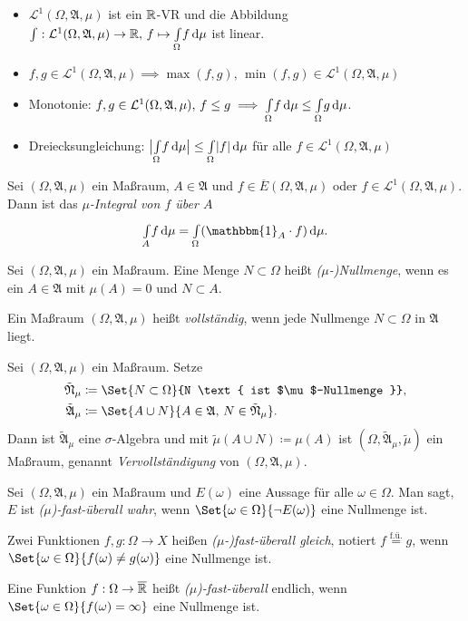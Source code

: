 \documentclass{cheat-sheet}
\newcommand{\ER}{\overline\R} %
\newcommand{\Alg}{\mathfrak{A}}
\newcommand{\Leb}{\mathcal{L}} %
\newcommand{\ind}{\mathbbm{1}} %
\newcommand{\IntOmu}[1]{\Int{\Omega}{}{#1}{\mu}}
\begin{document}
\begin{satz}
  \begin{itemize}
    \item $\Leb^1(\Omega, \Alg, \mu)$ ist ein $\mathbb{R}$-VR und die Abbildung ${\textstyle \int} : \Leb^1(\Omega, \Alg, \mu) \to \R, \, f \mapsto \IntOmu{f}$ ist linear.
    \item $f, g \in \Leb^1(\Omega, \Alg, \mu) \implies \max(f, g), \, \min(f, g) \in \Leb^1(\Omega, \Alg, \mu)$
    \item Monotonie: $f, g \in \Leb^1(\Omega, \Alg, \mu), \, f \leq g \implies \IntOmu{f} \leq \IntOmu{g}$.
    \item Dreiecksungleichung: $\big| \IntOmu{f} \big| \leq \IntOmu{|f|}$ für alle $f \in \Leb^1(\Omega, \Alg, \mu)$
  \end{itemize}
\end{satz}

\begin{defn}
  Sei $(\Omega, \Alg, \mu)$ ein Maßraum, $A \in \Alg$ und $f \in \overline{E}(\Omega, \Alg, \mu)$ oder $f \in \Leb^1(\Omega, \Alg, \mu)$. Dann ist das \emph{$\mu$-Integral von $f$ über $A$}
  \[ \Int{A}{}{f}{\mu} = \IntOmu{(\ind_A \cdot f)}. \]
\end{defn}

\begin{defn}
  Sei $(\Omega, \Alg, \mu)$ ein Maßraum. Eine Menge $N \subset \Omega$ heißt \emph{($\mu$-)Nullmenge}, wenn es ein $A \in \Alg$ mit $\mu(A) = 0$ und $N \subset A$.
\end{defn}

\begin{defn}
  Ein Maßraum $(\Omega, \Alg, \mu)$ heißt \emph{vollständig}, wenn jede Nullmenge $N \subset \Omega$ in $\Alg$ liegt.
\end{defn}

\begin{defn}
  Sei $(\Omega, \Alg, \mu)$ ein Maßraum. Setze
  \begin{align*}
    \tilde{\mathfrak{N}}_\mu &\coloneqq \Set{N \subset \Omega}{N \text{ ist $\mu$-Nullmenge }}, \\
    \tilde{\Alg}_\mu &\coloneqq \Set{ A \cup N }{ A \in \Alg, \, N \in \tilde{\mathfrak{N}}_\mu }.
  \end{align*}
  Dann ist $\tilde{\Alg}_\mu$ eine $\sigma$-Algebra und mit $\tilde{\mu}(A \cup N) \coloneqq \mu(A)$ ist $(\Omega, \tilde{\Alg}_\mu, \tilde{\mu})$ ein Maßraum, genannt \emph{Vervollständigung} von $(\Omega, \Alg, \mu)$.
\end{defn}

\begin{defn}
  Sei $(\Omega, \Alg, \mu)$ ein Maßraum und $E(\omega)$ eine Aussage für alle $\omega \in \Omega$. Man sagt, $E$ ist \emph{($\mu$)-fast-überall wahr}, wenn $\Set{\omega \in \Omega}{\neg E(\omega)}$ eine Nullmenge ist.

  Zwei Funktionen $f, g : \Omega \to X$ heißen \emph{($\mu$-)fast-überall gleich}, notiert $f \overset{\text{f.ü.}}= g$, wenn $\Set{\omega \in \Omega}{f(\omega) \not= g(\omega)}$ eine Nullmenge ist.

  Eine Funktion $f : \Omega \to \ER$ heißt \emph{($\mu$)-fast-überall} endlich, wenn $\Set{\omega \in \Omega}{ f(\omega) = \infty}$ eine Nullmenge ist.
\end{defn}
\end{document}
